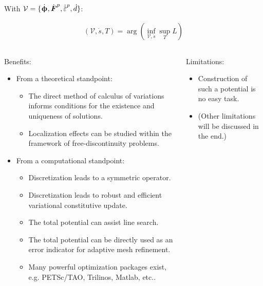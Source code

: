 \begin{frame}
  With $\mathcal{V} = \{ \defrate, \dot{\defgrad}^p, \epdot, \dot{d} \}$:
  \begin{block}{}
    \vspace{-0.5em}
    \begin{align*}
      \left( \mathcal{V}, \dot{s}, T \right) = \arg \left( \inf_{\mathcal{V}, \dot{s}} \sup_T L \right)
    \end{align*}
  \end{block}
  
  \begin{columns}
    \pause
    \begin{column}{0.6\textwidth}
      Benefits:
      \begin{itemize}
        \item From a theoretical standpoint:
              \begin{itemize}
                \item The direct method of calculus of variations informs conditions for the existence and uniqueness of solutions.
                \item Localization effects can be studied within the framework of free-discontinuity problems.
              \end{itemize}
        \item From a computational standpoint:
              \begin{itemize}
                \item Discretization leads to a symmetric operator.
                \item Discretization leads to robust and efficient variational constitutive update.
                \item The total potential can assist line search.
                \item The total potential can be directly used as an error indicator for adaptive mesh refinement.
                \item Many powerful optimization packages exist, e.g. PETSc/TAO, Trilinos, Matlab, etc..
              \end{itemize}
      \end{itemize}
    \end{column}
    \pause
    \begin{column}{0.4\textwidth}
      Limitations:
      \begin{itemize}
        \item Construction of such a potential is no easy task.
        \item (Other limitations will be discussed in the end.)

\end{itemize}
\end{column}
\end{columns}
\end{frame}
